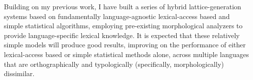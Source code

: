 Building on my previous work, I have built a series of hybrid lattice-generation systems based on fundamentally language-agnostic lexical-access based and simple statistical algorithms, employing pre-existing morphological analyzers to provide language-specific lexical knowledge. It is expected that these relatively simple models will produce good results, improving on the performance of either lexical-access based or simple statistical methods alone, across multiple languages that are orthographically and typologically (specifically, morphologically) dissimilar.